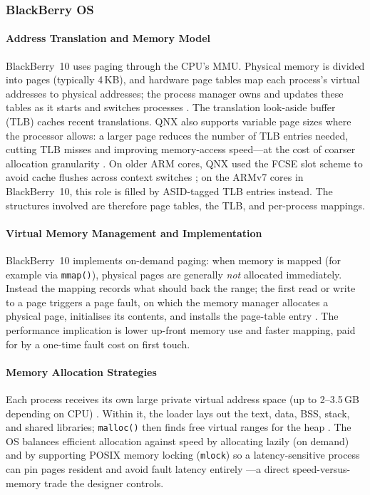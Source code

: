 \subsubsection{BlackBerry OS}

\paragraph{Address Translation and Memory Model}

BlackBerry~10 uses paging through the CPU's MMU. Physical memory is
divided into pages (typically 4\,KB), and hardware page tables map each
process's virtual addresses to physical addresses; the process manager
owns and updates these tables as it starts and switches processes
\citep{qnx_memman}. The translation look-aside buffer (TLB) caches
recent translations. QNX also supports variable page sizes where the
processor allows: a larger page reduces the number of TLB entries
needed, cutting TLB misses and improving memory-access speed---at the
cost of coarser allocation granularity \citep{qnx_memman}. On older ARM cores, QNX
used the FCSE slot scheme to avoid cache flushes across context
switches \citep{qnx_arm_memory}; on the ARMv7 cores in BlackBerry~10,
this role is filled by ASID-tagged TLB entries instead. The structures involved are
therefore page tables, the TLB, and per-process mappings.

\paragraph{Virtual Memory Management and Implementation}

BlackBerry~10 implements on-demand paging: when memory is mapped (for
example via \texttt{mmap()}), physical pages are generally \emph{not}
allocated immediately. Instead the mapping records what should back the range;
the first read or write to a page triggers a page fault, on which the
memory manager allocates a physical page, initialises its contents,
and installs the page-table entry \citep{membarrier_qnx8_mem}. The
performance implication is lower up-front memory use and faster
mapping, paid for by a one-time fault cost on first touch.

\paragraph{Memory Allocation Strategies}

Each process receives its own large private virtual address space (up
to 2--3.5\,GB depending on CPU) \citep{qnx_memman}. Within it, the
loader lays out the text, data, BSS, stack, and shared libraries;
\texttt{malloc()} then finds free virtual ranges for the heap
\citep{qnx_arm_memory}. The OS balances efficient allocation against
speed by allocating lazily (on demand) and by supporting POSIX memory
locking (\texttt{mlock}) so a latency-sensitive process can pin pages
resident and avoid fault latency entirely \citep{qnx_memman}---a direct
speed-versus-memory trade the designer controls.

